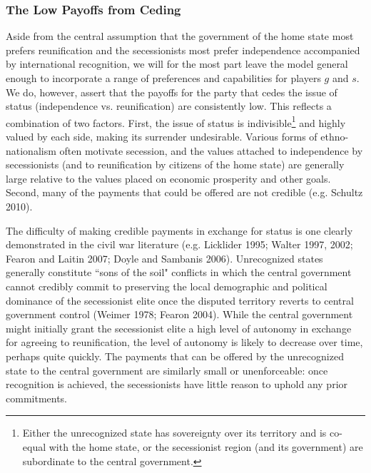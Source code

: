 \documentclass[11pt,letterpaper, notitlepage]{article}
\begin{document}
\subsubsection{The Low Payoffs from Ceding}
Aside from the central assumption that the government of the home state most prefers reunification and the secessionists most prefer independence accompanied by international recognition, we will for the most part leave the model general enough to incorporate a range of preferences and capabilities for players $g$ and $s$. %
We do, however, assert that the payoffs for the party that cedes the issue of status (independence vs. reunification) are consistently low. This reflects a combination of two factors. First, the issue of status is indivisible\footnote{Either the unrecognized state has sovereignty over its territory and is co-equal with the home state, or the secessionist region (and its government) are subordinate to the central government.} and highly valued by each side, making its surrender undesirable. Various forms of ethno-nationalism often motivate secession, and the values attached to independence by secessionists (and to reunification by citizens of the home state) are generally large relative to the values placed on economic prosperity and other goals. Second, many of the payments that could be offered are not credible (e.g. Schultz 2010).

The difficulty of making credible payments in exchange for status is one clearly demonstrated in the civil war literature (e.g. Licklider 1995; Walter 1997, 2002; Fearon and Laitin 2007; Doyle and Sambanis 2006). Unrecognized states generally constitute ``sons of the soil" conflicts in which the central government cannot credibly commit to preserving the local demographic and political dominance of the secessionist elite once the disputed territory reverts to central government control (Weimer 1978; Fearon 2004). While the central government might initially grant the secessionist elite a high level of autonomy in exchange for agreeing to reunification, the level of autonomy is likely to decrease over time, perhaps quite quickly. The payments that can be offered by the unrecognized state to the central government are similarly small or unenforceable: once recognition is achieved, the secessionists have little reason to uphold any prior commitments. 
\end{document}
